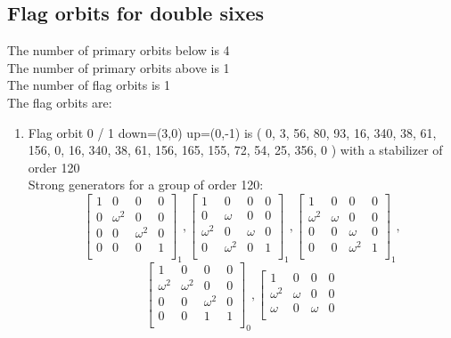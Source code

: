 \subsection*{Flag orbits for double sixes}
The number of primary orbits below is 4\\
The number of primary orbits above is 1\\
The number of flag orbits is 1\\
The flag orbits are:
\begin{enumerate}[(1)]
\item
Flag orbit 0 / 1 down=(3,0) up=(0,-1) is ( 0, 3, 56, 80, 93, 16, 340, 38, 61, 156, 0, 16, 340, 38, 61, 156, 165, 155, 72, 54, 25, 356, 0 ) with a stabilizer of order 120\\
Strong generators for a group of order 120:
$$
\left[
\begin{array}{*{4}{r}}
1 & 0 & 0 & 0\\
0 & \omega^{2} & 0 & 0\\
0 & 0 & \omega^{2} & 0\\
0 & 0 & 0 & 1\\
\end{array}
\right]
_{1}
, 
\left[
\begin{array}{*{4}{r}}
1 & 0 & 0 & 0\\
0 & \omega  & 0 & 0\\
\omega^{2} & 0 & \omega  & 0\\
0 & \omega^{2} & 0 & 1\\
\end{array}
\right]
_{1}
, 
\left[
\begin{array}{*{4}{r}}
1 & 0 & 0 & 0\\
\omega^{2} & \omega  & 0 & 0\\
0 & 0 & \omega  & 0\\
0 & 0 & \omega^{2} & 1\\
\end{array}
\right]
_{1}
, 
$$
$$
\left[
\begin{array}{*{4}{r}}
1 & 0 & 0 & 0\\
\omega^{2} & \omega^{2} & 0 & 0\\
0 & 0 & \omega^{2} & 0\\
0 & 0 & 1 & 1\\
\end{array}
\right]
_{0}
, 
\left[
\begin{array}{*{4}{r}}
1 & 0 & 0 & 0\\
\omega^{2} & \omega  & 0 & 0\\
\omega  & 0 & \omega  & 0\\

\end{array}$$
\end{enumerate}
